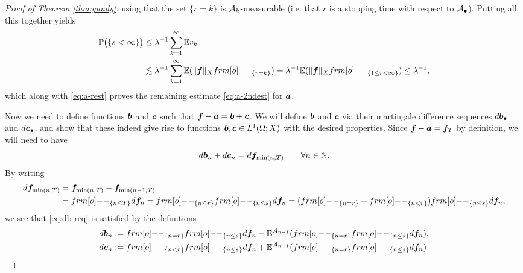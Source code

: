 \begin{proof}[Proof of Theorem \ref{thm:gundy}]
  using that the set $\{r = k\}$ is $\mathcal{A}_{k}$-measurable (i.e. that $r$ is a stopping time with respect to $\mathcal{A}_{\bullet}$).
  Putting all this together yields
  \begin{equation*}
    \begin{aligned}
      \P\big(\{s < \infty\}\big)
      &\leq \lambda^{-1} \sum_{k=1}^{\infty} \E v_{k} \\
      &\lesssim \lambda^{-1} \sum_{k=1}^{\infty} \E (\|\mb{f}\|_{X} \1_{\{r = k\}})
      = \lambda^{-1} \E(\|\mb{f}\|_{X} \1_{\{1 \leq r < \infty\}}) \leq \lambda^{-1},
    \end{aligned}
  \end{equation*}
  which along with \eqref{eq:a-rest} proves the remaining estimate \eqref{eq:a-2ndest} for $\bm{a}$.
  
  Now we need to define functions $\bm{b}$ and $\bm{c}$ such that $\bm{f} - \bm{a} = \bm{b} + \bm{c}$.
  We will define $\bm{b}$ and $\bm{c}$ via their martingale difference sequences $d\bm{b}_{\bullet}$ and $d\bm{c}_{\bullet}$, and show that these indeed give rise to functions $\bm{b}, \bm{c} \in L^1(\Omega;X)$ with the desired properties.
  Since $\bm{f} - \bm{a} = \bm{f}_{T}$ by definition, we will need to have
  \begin{equation}\label{eq:db-req}
    d\bm{b}_{n} + d\bm{c}_{n} = d\bm{f}_{\min(n,T)} \qquad \forall n \in \mathbb{N}.
  \end{equation}
  By writing
  \begin{equation*}
    \begin{aligned}
      d\mb{f}_{\min(n,T)}
      &= \mb{f}_{\min(n,T)} - \mb{f}_{\min(n-1,T)} \\
      &= \1_{\{n \leq T\}} d\mb{f}_{n} 
      = \1_{\{n \leq r\}} \1_{\{n \leq s\}} d\mb{f}_{n} 
      =  ( \1_{\{n = r\}} + \1_{\{n < r\}}) \1_{\{n \leq s\}} d\mb{f}_{n},
    \end{aligned}
  \end{equation*}
  we see that \eqref{eq:db-req} is satisfied by the definitions
  \begin{equation*}
    \begin{aligned}
      d\mb{b}_{n} &:= \1_{\{n = r\}} \1_{\{n \leq s\}} d\mb{f}_{n}  - \E^{\mc{A}_{n-1}} (\1_{\{n = r\}} \1_{\{n \leq s\}} d\mb{f}_{n} ), \\
      d\mb{c}_{n} &:= \1_{\{n < r\}} \1_{\{n \leq s\}} d\mb{f}_{n}  + \E^{\mc{A}_{n-1}} (\1_{\{n = r\}} \1_{\{n \leq s\}} d\mb{f}_{n} )
    \end{aligned}
  \end{equation*}

\end{proof}
